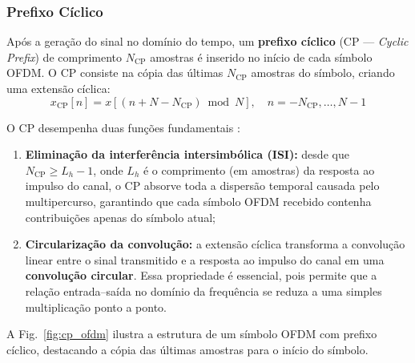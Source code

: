 \documentclass[conference]{IEEEtran}
\begin{document}
\subsubsection{Prefixo Cíclico}

Após a geração do sinal no domínio do tempo, um \textbf{prefixo cíclico} (CP --- \textit{Cyclic Prefix}) de comprimento $N_{\text{CP}}$ amostras é inserido no início de cada símbolo OFDM. O CP consiste na cópia das últimas $N_{\text{CP}}$ amostras do símbolo, criando uma extensão cíclica:
\begin{equation}
    x_{\text{CP}}[n] = x\!\left[(n + N - N_{\text{CP}}) \bmod N\right], \quad n = -N_{\text{CP}}, \ldots, N-1
    \label{eq:cp}
\end{equation}

O CP desempenha duas funções fundamentais \cite{proakis2008, goldsmith2005}:
\begin{enumerate}
    \item \textbf{Eliminação da interferência intersimbólica (ISI):} desde que $N_{\text{CP}} \geq L_h - 1$, onde $L_h$ é o comprimento (em amostras) da resposta ao impulso do canal, o CP absorve toda a dispersão temporal causada pelo multipercurso, garantindo que cada símbolo OFDM recebido contenha contribuições apenas do símbolo atual;
    \item \textbf{Circularização da convolução:} a extensão cíclica transforma a convolução linear entre o sinal transmitido e a resposta ao impulso do canal em uma \textbf{convolução circular}. Essa propriedade é essencial, pois permite que a relação entrada--saída no domínio da frequência se reduza a uma simples multiplicação ponto a ponto.
\end{enumerate}

A Fig.~\ref{fig:cp_ofdm} ilustra a estrutura de um símbolo OFDM com prefixo cíclico, destacando a cópia das últimas amostras para o início do símbolo.
\end{document}
